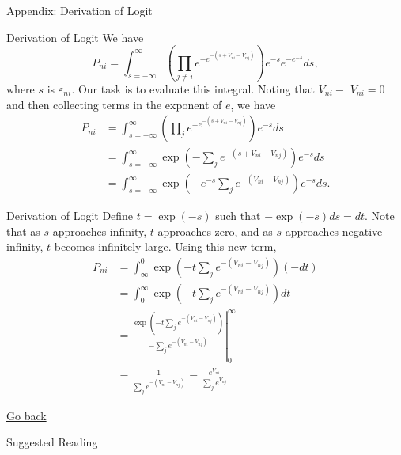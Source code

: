 
\begin{frame}[standout]
    Appendix: Derivation of Logit
\end{frame}


\begin{frame}{Derivation of Logit}
\label{DofL}
We have
$$
P_{n i}=\int_{s=-\infty}^{\infty}\left(\prod_{j \neq i} e^{-e^{-\left(s+V_{n i}-V_{n j}\right)}}\right) e^{-s} e^{-e^{-s}} d s,
$$
where $s$ is $\varepsilon_{n i}$. Our task is to evaluate this integral. Noting that $V_{n i}-$ $V_{n i}=0$ and then collecting terms in the exponent of $e$, we have
$$
\begin{aligned}
P_{n i} & =\int_{s=-\infty}^{\infty}\left(\prod_j e^{-e^{-\left(s+V_{n i}-V_{n j}\right)}}\right) e^{-s} d s \\
& =\int_{s=-\infty}^{\infty} \exp \left(-\sum_j e^{-\left(s+V_{n i}-V_{n j}\right)}\right) e^{-s} d s \\
& =\int_{s=-\infty}^{\infty} \exp \left(-e^{-s} \sum_j e^{-\left(V_{n i}-V_{n j}\right)}\right) e^{-s} d s .
\end{aligned}
$$

\end{frame}



\begin{frame}{Derivation of Logit}
Define $t=\exp (-s)$ such that $-\exp (-s) d s=d t$. Note that as $s$ approaches infinity, $t$ approaches zero, and as $s$ approaches negative infinity, $t$ becomes infinitely large. Using this new term,
$$
\begin{aligned}
P_{n i} & =\int_{\infty}^0 \exp \left(-t \sum_j e^{-\left(V_{n i}-V_{n j}\right)}\right)(-d t) \\
& =\int_0^{\infty} \exp \left(-t \sum_j e^{-\left(V_{n i}-V_{n j}\right)}\right) d t \\
& =\left.\frac{\exp \left(-t \sum_j e^{-\left(V_{n i}-V_{n j}\right)}\right)}{-\sum_j e^{-\left(V_{n i}-V_{n j}\right)}}\right|_0 ^{\infty} \\
& =\frac{1}{\sum_j e^{-\left(V_{n i}-V_{n j}\right)}}=\frac{e^{V_{n i}}}{\sum_j e^{V_{n j}}}
\end{aligned}
$$

\hyperlink{logit}{Go back}
\end{frame}




\nocite{Train2009,PerraillonEtAl2023,Karaca-MandicEtAl2012,NortonEtAl2004}

\begin{frame}[allowframebreaks]{Suggested Reading}
    
\end{frame}




